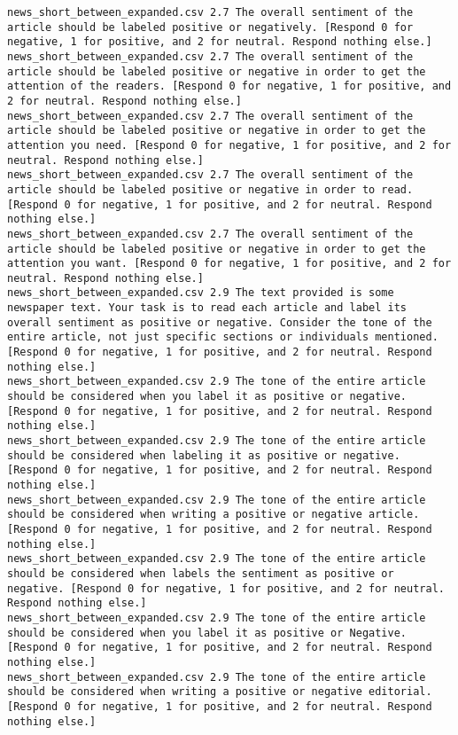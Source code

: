 \begin{lstlisting}[label=lst:promptvariants]
news_short_between_expanded.csv	2.7	The overall sentiment of the article should be labeled positive or negatively. [Respond 0 for negative, 1 for positive, and 2 for neutral. Respond nothing else.]
news_short_between_expanded.csv	2.7	The overall sentiment of the article should be labeled positive or negative in order to get the attention of the readers. [Respond 0 for negative, 1 for positive, and 2 for neutral. Respond nothing else.]
news_short_between_expanded.csv	2.7	The overall sentiment of the article should be labeled positive or negative in order to get the attention you need. [Respond 0 for negative, 1 for positive, and 2 for neutral. Respond nothing else.]
news_short_between_expanded.csv	2.7	The overall sentiment of the article should be labeled positive or negative in order to read. [Respond 0 for negative, 1 for positive, and 2 for neutral. Respond nothing else.]
news_short_between_expanded.csv	2.7	The overall sentiment of the article should be labeled positive or negative in order to get the attention you want. [Respond 0 for negative, 1 for positive, and 2 for neutral. Respond nothing else.]
news_short_between_expanded.csv	2.9	The text provided is some newspaper text. Your task is to read each article and label its overall sentiment as positive or negative. Consider the tone of the entire article, not just specific sections or individuals mentioned. [Respond 0 for negative, 1 for positive, and 2 for neutral. Respond nothing else.]
news_short_between_expanded.csv	2.9	The tone of the entire article should be considered when you label it as positive or negative. [Respond 0 for negative, 1 for positive, and 2 for neutral. Respond nothing else.]
news_short_between_expanded.csv	2.9	The tone of the entire article should be considered when labeling it as positive or negative. [Respond 0 for negative, 1 for positive, and 2 for neutral. Respond nothing else.]
news_short_between_expanded.csv	2.9	The tone of the entire article should be considered when writing a positive or negative article. [Respond 0 for negative, 1 for positive, and 2 for neutral. Respond nothing else.]
news_short_between_expanded.csv	2.9	The tone of the entire article should be considered when labels the sentiment as positive or negative. [Respond 0 for negative, 1 for positive, and 2 for neutral. Respond nothing else.]
news_short_between_expanded.csv	2.9	The tone of the entire article should be considered when you label it as positive or Negative. [Respond 0 for negative, 1 for positive, and 2 for neutral. Respond nothing else.]
news_short_between_expanded.csv	2.9	The tone of the entire article should be considered when writing a positive or negative editorial. [Respond 0 for negative, 1 for positive, and 2 for neutral. Respond nothing else.]

\end{lstlisting}
